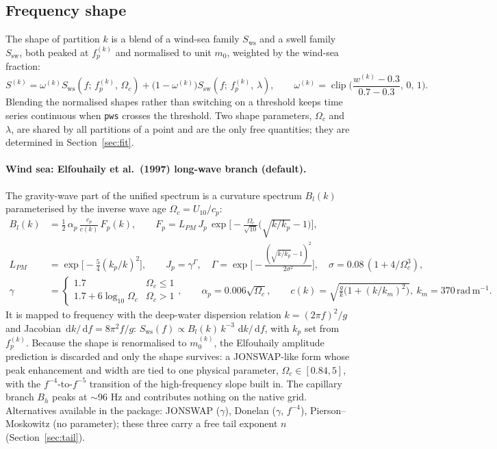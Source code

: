 \documentclass[11pt,a4paper]{article}
\newcommand{\dd}{\,\mathrm{d}}
\begin{document}
\subsection{Frequency shape}

The shape of partition $k$ is a blend of a wind-sea family $S_{\mathrm{ws}}$ and a swell family
$S_{\mathrm{sw}}$, both peaked at $f_p^{(k)}$ and normalised to unit $m_0$, weighted by the wind-sea
fraction:
\begin{equation}
S^{(k)} = \omega^{(k)} S_{\mathrm{ws}}(f;\,f_p^{(k)},\,\Omega_c) + \big(1-\omega^{(k)}\big) S_{\mathrm{sw}}(f;\,f_p^{(k)},\,\lambda),
\qquad
\omega^{(k)} = \operatorname{clip}\!\Big(\frac{w^{(k)}-0.3}{0.7-0.3},\,0,\,1\Big).
\end{equation}
Blending the normalised shapes rather than switching on a threshold keeps time series continuous when
\texttt{pws} crosses the threshold. Two shape parameters, $\Omega_c$ and $\lambda$, are shared by all
partitions of a point and are the only free quantities; they are determined in Section~\ref{sec:fit}.

\paragraph{Wind sea: Elfouhaily et al.\ (1997) long-wave branch (default).}
The gravity-wave part of the unified spectrum is a curvature spectrum $B_l(k)$ parameterised by the
inverse wave age $\Omega_c = U_{10}/c_p$:
\begin{align}
B_l(k) &= \tfrac12\,\alpha_p\,\frac{c_p}{c(k)}\,F_p(k),\qquad
F_p = L_{PM}\,J_p\,\exp\!\Big[-\frac{\Omega_c}{\sqrt{10}}\Big(\sqrt{k/k_p}-1\Big)\Big],\\
L_{PM} &= \exp\!\big[-\tfrac54 (k_p/k)^2\big],\qquad
J_p = \gamma^{\Gamma},\quad
\Gamma = \exp\!\Big[-\frac{(\sqrt{k/k_p}-1)^2}{2\sigma^2}\Big],\quad
\sigma = 0.08\,(1 + 4/\Omega_c^3),\\
\gamma &= \begin{cases}1.7 & \Omega_c \le 1\\ 1.7 + 6\log_{10}\Omega_c & \Omega_c>1\end{cases},
\qquad \alpha_p = 0.006\sqrt{\Omega_c},
\qquad c(k) = \sqrt{\tfrac{g}{k}\big(1+(k/k_m)^2\big)},\ k_m = 370\,\mathrm{rad\,m^{-1}} .
\end{align}
It is mapped to frequency with the deep-water dispersion relation $k = (2\pi f)^2/g$ and Jacobian
$\dd k/\dd f = 8\pi^2 f/g$: $S_{\mathrm{ws}}(f) \propto B_l(k)\,k^{-3}\,\dd k/\dd f$, with $k_p$ set from
$f_p^{(k)}$. Because the shape is renormalised to $m_0^{(k)}$, the Elfouhaily amplitude prediction is
discarded and only the shape survives: a JONSWAP-like form whose peak enhancement and width are tied
to one physical parameter, $\Omega_c\in[0.84, 5]$, with the $f^{-4}$-to-$f^{-5}$ transition of the
high-frequency slope built in. The capillary branch $B_h$ peaks at $\sim$96 Hz and contributes nothing
on the native grid. Alternatives available in the package: JONSWAP ($\gamma$), Donelan ($\gamma$,
$f^{-4}$), Pierson--Moskowitz (no parameter); these three carry a free tail exponent $n$
(Section~\ref{sec:tail}).
\end{document}
